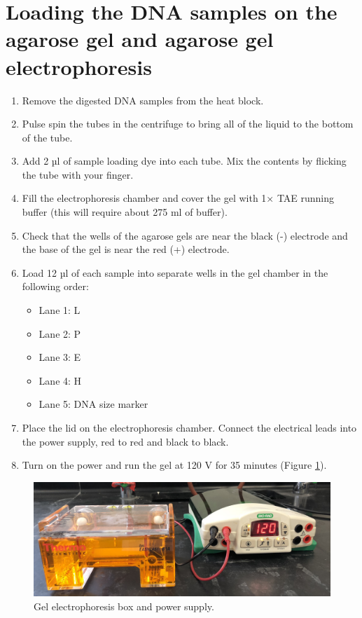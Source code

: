 \section{Loading the DNA samples on the agarose gel and agarose gel
electrophoresis}\label{loading-the-dna-samples-on-the-agarose-gel-and-agarose-gel-electrophoresis}

\begin{enumerate}
\def\labelenumi{\arabic{enumi}.}
\tightlist
\item
  Remove the digested DNA samples from the heat block.
\item
  Pulse spin the tubes in the centrifuge to bring all of the liquid to
  the bottom of the tube.
\item
  Add 2 µl of sample loading dye into each tube. Mix the contents by
  flicking the tube with your finger.
\item
  Fill the electrophoresis chamber and cover the gel with 1× TAE running
  buffer (this will require about 275 ml of buffer).
\item
  Check that the wells of the agarose gels are near the black (-)
  electrode and the base of the gel is near the red (+) electrode.
\item
  Load 12 µl of each sample into separate wells in the gel chamber in
  the following order:

  \begin{itemize}
  \tightlist
  \item
    Lane 1: L
  \item
    Lane 2: P
  \item
    Lane 3: E
  \item
    Lane 4: H
  \item
    Lane 5: DNA size marker
  \end{itemize}
\item
  Place the lid on the electrophoresis chamber. Connect the electrical
  leads into the power supply, red to red and black to black.
\item
  Turn on the power and run the gel at 120 V for 35 minutes (Figure
  \ref{fig:power}).
\end{enumerate}

\begin{figure}

{\centering \includegraphics[width=0.7\linewidth]{./figures/molbio/Power_supply}

}

\caption{Gel electrophoresis box and power supply.}\label{fig:power}
\end{figure}

